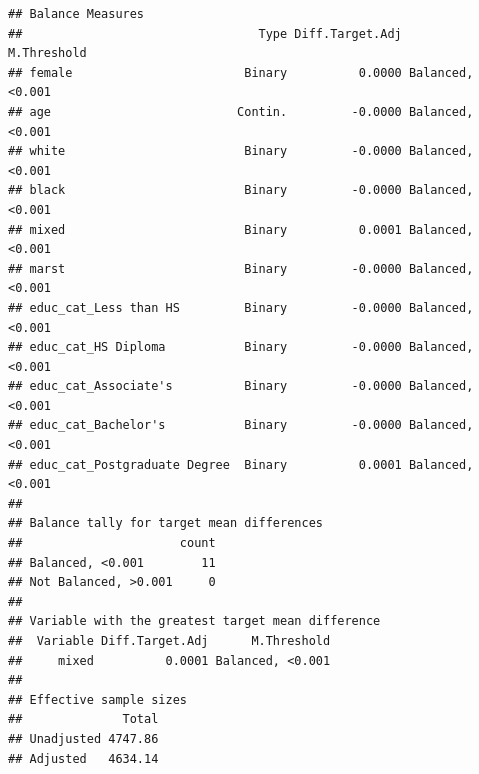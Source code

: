 \documentclass[
]{article}
\begin{document}
\begin{verbatim}
## Balance Measures
##                                 Type Diff.Target.Adj      M.Threshold
## female                        Binary          0.0000 Balanced, <0.001
## age                          Contin.         -0.0000 Balanced, <0.001
## white                         Binary         -0.0000 Balanced, <0.001
## black                         Binary         -0.0000 Balanced, <0.001
## mixed                         Binary          0.0001 Balanced, <0.001
## marst                         Binary         -0.0000 Balanced, <0.001
## educ_cat_Less than HS         Binary         -0.0000 Balanced, <0.001
## educ_cat_HS Diploma           Binary         -0.0000 Balanced, <0.001
## educ_cat_Associate's          Binary         -0.0000 Balanced, <0.001
## educ_cat_Bachelor's           Binary         -0.0000 Balanced, <0.001
## educ_cat_Postgraduate Degree  Binary          0.0001 Balanced, <0.001
## 
## Balance tally for target mean differences
##                      count
## Balanced, <0.001        11
## Not Balanced, >0.001     0
## 
## Variable with the greatest target mean difference
##  Variable Diff.Target.Adj      M.Threshold
##     mixed          0.0001 Balanced, <0.001
## 
## Effective sample sizes
##              Total
## Unadjusted 4747.86
## Adjusted   4634.14
\end{verbatim}
\end{document}
